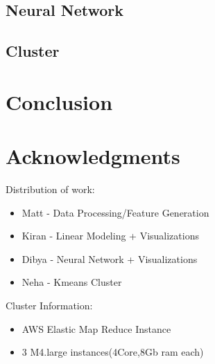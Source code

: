 \documentclass[11pt,letterpaper]{article}
\begin{document}
\subsection{Neural Network}
\label{ssec:nnResult}

\subsection{Cluster}
\label{ssec:clusterResult}

\section{Conclusion}

\section*{Acknowledgments}
Distribution of work:
\begin{itemize}
	\item {Matt - Data Processing/Feature Generation}
	\item {Kiran - Linear Modeling + Visualizations}
	\item {Dibya - Neural Network + Visualizations}
	\item {Neha - Kmeans Cluster}
\end{itemize}

Cluster Information:
\begin{itemize}
	\item{AWS Elastic Map Reduce Instance}
	\item{3 M4.large instances(4Core,8Gb ram each)}
\end{itemize}



\end{document}
